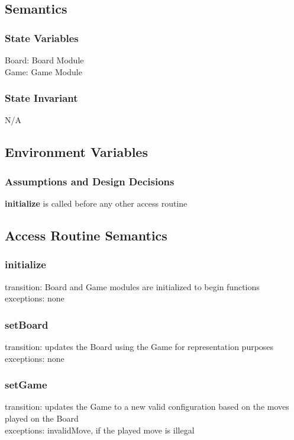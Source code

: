 \documentclass{article}
\begin{document}
    \subsection*{Semantics}
        \subsubsection*{State Variables}
            Board: Board Module\\
            Game: Game Module
            
        \subsubsection*{State Invariant}
            N/A
            
    \subsection*{Environment Variables}
            
        \subsubsection*{Assumptions and Design Decisions}
            \textbf{initialize} is called before any other access routine
            
    \subsection*{Access Routine Semantics}
    \subsubsection*{initialize} 
            transition: Board and Game modules are initialized to begin functions\\
            exceptions: none
            
        \subsubsection*{setBoard} 
            transition: updates the Board using the Game for representation purposes\\
            exceptions: none
        
        \subsubsection*{setGame} 
            transition: updates the Game to a new valid configuration based on
            the moves played on the Board\\
            exceptions: invalidMove, if the played move is illegal
\end{document}
